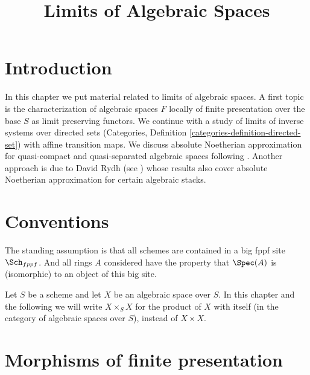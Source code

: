 

%


\title{Limits of Algebraic Spaces}


\maketitle

\label{section-phantom}

\tableofcontents

\section{Introduction}
\label{section-introduction}

\noindent
In this chapter we put material related to limits of algebraic spaces.
A first topic is the characterization of algebraic spaces $F$ locally
of finite presentation over the base $S$ as limit preserving functors.
We continue with a study of limits of inverse systems over
directed sets (Categories, Definition \ref{categories-definition-directed-set})
with affine transition maps. We discuss absolute
Noetherian approximation for quasi-compact and quasi-separated algebraic
spaces following \cite{CLO}. Another approach is due to David Rydh (see
\cite{rydh_approx}) whose results also cover absolute Noetherian
approximation for certain algebraic stacks.


\section{Conventions}
\label{section-conventions}

\noindent
The standing assumption is that all schemes are contained in
a big fppf site $\Sch_{fppf}$. And all rings $A$ considered
have the property that $\Spec(A)$ is (isomorphic) to an
object of this big site.

\medskip\noindent
Let $S$ be a scheme and let $X$ be an algebraic space over $S$.
In this chapter and the following we will write $X \times_S X$
for the product of $X$ with itself (in the category of algebraic
spaces over $S$), instead of $X \times X$.











\section{Morphisms of finite presentation}
\label{section-finite-presentation}

